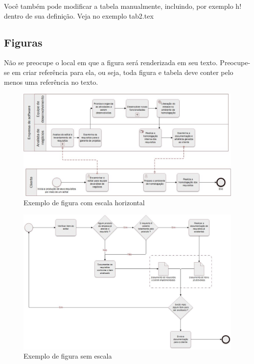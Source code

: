 \documentclass[	DIV=calc,%
							paper=a4,%
							fontsize=12pt,%
							onecolumn]{scrartcl}	 					%
\begin{document}
Você também pode modificar a tabela manualmente, incluindo, por exemplo h! dentro de sua definição. Veja no exemplo tab2.tex

\subsection{Figuras}

Não se preocupe o local em que a figura será renderizada em seu texto. Preocupe-se em criar referência para ela, ou seja, toda figura e tabela deve conter pelo menos uma referência no texto.

\begin{figure}
\centering
\includegraphics[width=\textwidth]{processo_de_software_BPMN1}
\caption{Exemplo de figura com escala horizontal}
\end{figure}


\begin{figure}
	\centering
	\includegraphics[width=\textwidth]{processo_de_software_BPMN2}
	\caption{Exemplo de figura sem escala}
	\label{fig2}
\end{figure}
\end{document}
